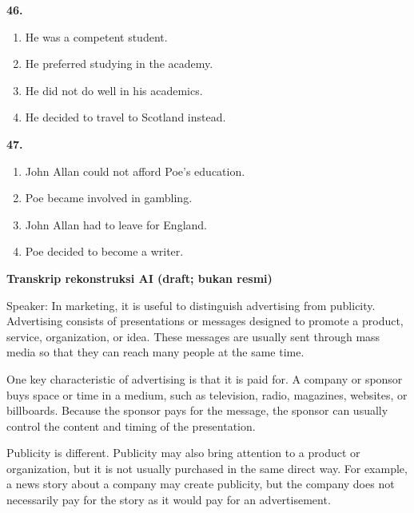 \documentclass[12pt]{article}
\begin{document}
\par
\vspace{0.25\baselineskip}
\noindent\textbf{46.}
\begin{enumerate}[label=(\Alph*),leftmargin=*,itemsep=0.2em]
\item He was a competent student.
\item He preferred studying in the academy.
\item He did not do well in his academics.
\item He decided to travel to Scotland instead.
\end{enumerate}
\par
\vspace{0.25\baselineskip}
\noindent\textbf{47.}
\begin{enumerate}[label=(\Alph*),leftmargin=*,itemsep=0.2em]
\item John Allan could not afford Poe's education.
\item Poe became involved in gambling.
\item John Allan had to leave for England.
\item Poe decided to become a writer.
\end{enumerate}
\par
\vspace{0.25\baselineskip}
\begin{exampleblock}
\textbf{Transkrip rekonstruksi AI (draft; bukan resmi)}\par
Speaker: In marketing, it is useful to distinguish advertising from publicity. Advertising consists of presentations or messages designed to promote a product, service, organization, or idea. These messages are usually sent through mass media so that they can reach many people at the same time.\par
One key characteristic of advertising is that it is paid for. A company or sponsor buys space or time in a medium, such as television, radio, magazines, websites, or billboards. Because the sponsor pays for the message, the sponsor can usually control the content and timing of the presentation.\par
Publicity is different. Publicity may also bring attention to a product or organization, but it is not usually purchased in the same direct way. For example, a news story about a company may create publicity, but the company does not necessarily pay for the story as it would pay for an advertisement.\par
\end{exampleblock}
\end{document}
